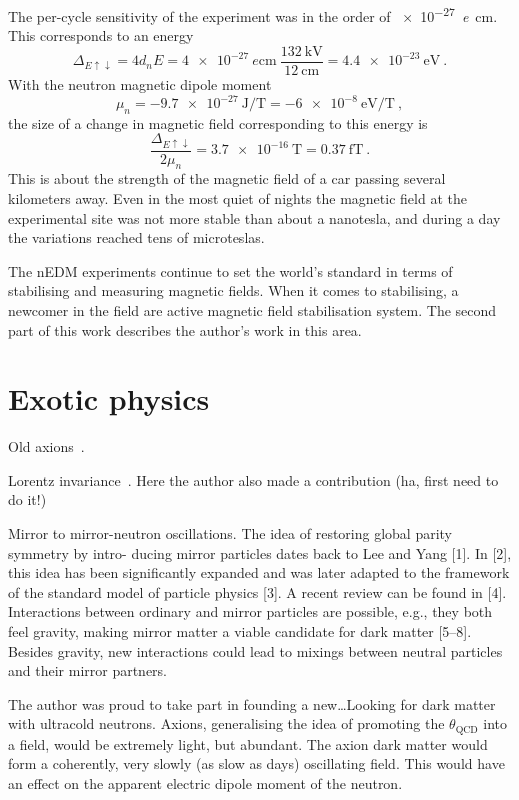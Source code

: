 The per-cycle sensitivity of the experiment was in the order of \SI{e-27}{\elementarycharge\centi\meter}. This corresponds to an energy
\begin{equation}
  \Delta_{E\uparrow\downarrow} = 4 d_n E = \SI{4e-27}{\elementarycharge\centi\meter} \ \frac{ \SI{132}{\kilo\volt} }{ \SI{12}{\centi\meter} } = \SI{4.4e-23}{\electronvolt} \ .
\end{equation}
With the neutron magnetic dipole moment
\begin{equation}
  \mu_n = \SI{-9.7e-27}{\joule\per\tesla} = \SI{-6e-8}{\electronvolt\per\tesla} \ ,
\end{equation}
the size of a change in magnetic field corresponding to this energy is
\begin{equation}
  \frac{ \Delta_{E\uparrow\downarrow} }{2 \mu_n} = \SI{3.7e-16}{\tesla} = \SI{0.37}{\femto\tesla} \ .
\end{equation}
This is about the strength of the magnetic field of a car passing several kilometers away. Even in the most quiet of nights the magnetic field at the experimental site was not more stable than about a nanotesla, and during a day the variations reached tens of microteslas.

The nEDM experiments continue to set the world's standard in terms of stabilising and measuring magnetic fields.
When it comes to stabilising, a newcomer in the field are active magnetic field stabilisation system. The second part of this work describes the author's work in this area.


\section{Exotic physics}

Old axions~\cite{Afach2015Exotic}.

Lorentz invariance~\cite{Altarev2009}. Here the author also made a contribution (ha, first need to do it!)

Mirror to mirror-neutron oscillations. The idea of restoring global parity symmetry by intro- ducing mirror particles dates back to Lee and Yang [1]. In [2], this idea has been significantly expanded and was later adapted to the framework of the standard model of particle physics [3]. A recent review can be found in [4]. Interactions between ordinary and mirror particles are possible, e.g., they both feel gravity, making mirror matter a viable candidate for dark matter [5–8]. Besides gravity, new interactions could lead to mixings between neutral particles and their mirror partners.~\cite{PhysRevD.80.032003}

The author was proud to take part in founding a new\ldots Looking for dark matter with ultracold neutrons. Axions, generalising the idea of promoting the $\theta_\text{QCD}$ into a field, would be extremely light, but abundant. The axion dark matter would form a coherently, very slowly (as slow as days) oscillating field. This would have an effect on the apparent electric dipole moment of the neutron.